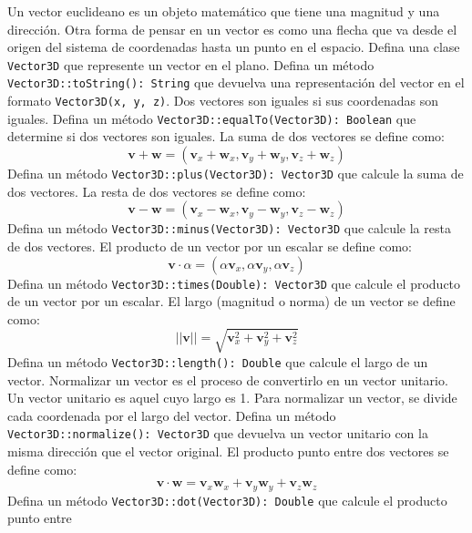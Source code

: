   \begin{Exercise}[title={Algebra Vectorial}]
    \Question Un vector euclideano es un objeto matemático que tiene una magnitud y una dirección.
      Otra forma de pensar en un vector es como una flecha que va desde el origen del sistema de
      coordenadas hasta un punto en el espacio.
      Defina una clase \texttt{Vector3D} que represente un vector en el plano.
    \Question Defina un método \texttt{Vector3D::toString(): String} que devuelva una representación
      del vector en el formato \texttt{Vector3D(x, y, z)}.
    \Question Dos vectores son iguales si sus coordenadas son iguales.
      Defina un método \texttt{Vector3D::equalTo(Vector3D): Boolean} que determine si dos vectores 
      son iguales.
    \Question La suma de dos vectores se define como:
      \[
        \mathbf{v} + \mathbf{w} = 
          (\mathbf{v}_x + \mathbf{w}_x, \mathbf{v}_y + \mathbf{w}_y, \mathbf{v}_z + \mathbf{w}_z)
      \]
      Defina un método \texttt{Vector3D::plus(Vector3D): Vector3D} que calcule la suma de dos 
      vectores.
    \Question La resta de dos vectores se define como:
      \[
        \mathbf{v} - \mathbf{w} = 
          (\mathbf{v}_x - \mathbf{w}_x, \mathbf{v}_y - \mathbf{w}_y, \mathbf{v}_z - \mathbf{w}_z)
      \]
      Defina un método \texttt{Vector3D::minus(Vector3D): Vector3D} que calcule la resta de dos 
      vectores.
    \Question El producto de un vector por un escalar se define como:
      \[
        \mathbf{v} \cdot \alpha = 
          (\alpha \mathbf{v}_x, \alpha \mathbf{v}_y, \alpha \mathbf{v}_z)
      \]
      Defina un método \texttt{Vector3D::times(Double): Vector3D} que calcule el producto de un 
      vector por un escalar.
    \Question El largo (magnitud o norma) de un vector se define como:
      \[
        ||\mathbf{v}|| = \sqrt{\mathbf{v}_x^2 + \mathbf{v}_y^2 + \mathbf{v}_z^2}
      \]
      Defina un método \texttt{Vector3D::length(): Double} que calcule el largo de un vector.
    \Question Normalizar un vector es el proceso de convertirlo en un vector unitario.
      Un vector unitario es aquel cuyo largo es 1.
      Para normalizar un vector, se divide cada coordenada por el largo del vector.
      Defina un método \texttt{Vector3D::normalize(): Vector3D} que devuelva un vector unitario 
      con la misma dirección que el vector original.
    \Question El producto punto entre dos vectores se define como:
      \[
        \mathbf{v} \cdot \mathbf{w} = 
          \mathbf{v}_x \mathbf{w}_x + \mathbf{v}_y \mathbf{w}_y + \mathbf{v}_z \mathbf{w}_z
      \]
      Defina un método \texttt{Vector3D::dot(Vector3D): Double} que calcule el producto punto entre 

\end{Exercise}
